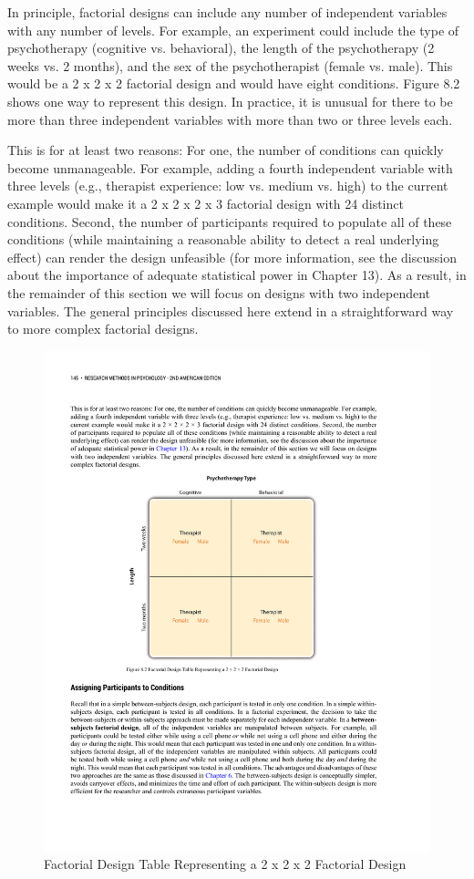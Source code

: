 In principle, factorial designs can include any number of independent variables with any number of levels. For example, an experiment could include the type of psychotherapy (cognitive vs. behavioral), the length of the psychotherapy (2 weeks vs. 2 months), and the sex of the psychotherapist (female vs. male). This would be a 2 x 2 x 2 factorial design and would have eight conditions. Figure 8.2 shows one way to represent this design. In practice, it is unusual for there to be more than three independent variables with more than two or three levels each.

This is for at least two reasons: For one, the number of conditions can quickly become unmanageable. For example, adding a fourth independent variable with three levels (e.g., therapist experience: low vs. medium vs. high) to the current example would make it a 2 x 2 x 2 x 3 factorial design with 24 distinct conditions. Second, the number of participants required to populate all of these conditions (while maintaining a reasonable ability to detect a real underlying effect) can render the design unfeasible (for more information, see the discussion about the importance of adequate statistical power in Chapter 13). As a result, in the remainder of this section we will focus on designs with two independent variables. The general principles discussed here extend in a straightforward way to more complex factorial designs.

\begin{figure}

\includegraphics[width=.7\linewidth]{figures/C83way.pdf}

\caption{Factorial Design Table Representing a 2 x 2 x 2 Factorial Design}

\label{fig:3way}

\end{figure}

